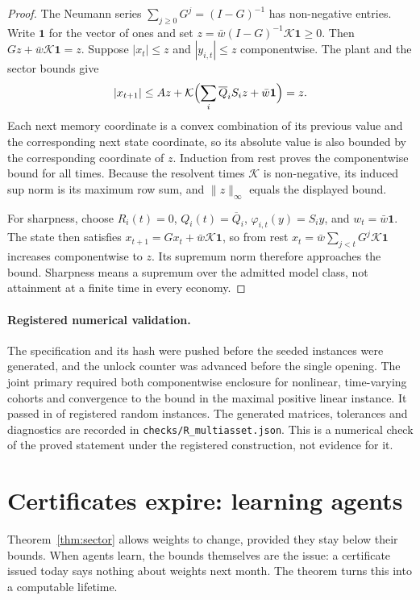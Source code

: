 \begin{proof}
The Neumann series $\sum_{j\ge0}G^j=(I-G)^{-1}$ has non-negative entries. Write $\mathbf1$ for the vector of ones and set $z=\bar w(I-G)^{-1}\mathcal K\mathbf1\ge0$. Then $Gz+\bar w\mathcal K\mathbf1=z$. Suppose $|x_t|\le z$ and $|y_{i,t}|\le z$ componentwise. The plant and the sector bounds give
\[
|x_{t+1}|\le A z+\mathcal K\Bigl(\sum_i\overline Q_i S_i z+\bar w\mathbf1\Bigr)=z.
\]
Each next memory coordinate is a convex combination of its previous value and the corresponding next state coordinate, so its absolute value is also bounded by the corresponding coordinate of $z$. Induction from rest proves the componentwise bound for all times. Because the resolvent times $\mathcal K$ is non-negative, its induced sup norm is its maximum row sum, and $\|z\|_\infty$ equals the displayed bound.

For sharpness, choose $R_i(t)=0$, $Q_i(t)=\overline Q_i$, $\varphi_{i,t}(y)=S_i y$, and $w_t=\bar w\mathbf1$. The state then satisfies $x_{t+1}=Gx_t+\bar w\mathcal K\mathbf1$, so from rest $x_t=\bar w\sum_{j<t}G^j\mathcal K\mathbf1$ increases componentwise to $z$. Its supremum norm therefore approaches the bound. Sharpness means a supremum over the admitted model class, not attainment at a finite time in every economy.
\end{proof}

\paragraph{Registered numerical validation.}

The specification and its hash were pushed before the seeded instances were generated, and the unlock counter was advanced before the single opening. The joint primary required both componentwise enclosure for nonlinear, time-varying cohorts and convergence to the bound in the maximal positive linear instance. It passed in \MultiassetPassed{} of \MultiassetCases{} registered random instances. The generated matrices, tolerances and diagnostics are recorded in \texttt{checks/R\_multiasset.json}. This is a numerical check of the proved statement under the registered construction, not evidence for it.

\section{Certificates expire: learning agents}\label{sec:bl_learning}

Theorem~\ref{thm:sector} allows weights to change, provided they stay below their bounds. When agents learn, the bounds themselves are the issue: a certificate issued today says nothing about weights next month. The theorem turns this into a computable lifetime.

